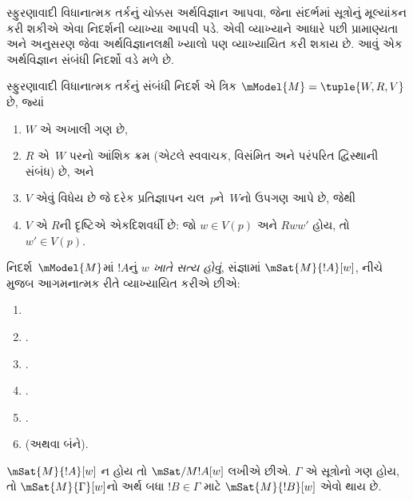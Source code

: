 \begingroup
\makeatletter{}\makeatother


\label{guunit:OLP-0500}


સ્ફુરણાવાદી વિધાનાત્મક તર્કનું ચોક્કસ અર્થવિજ્ઞાન આપવા,
જેના સંદર્ભમાં સૂત્રોનું મૂલ્યાંકન કરી શકીએ એવા
નિદર્શની વ્યાખ્યા આપવી પડે. એવી વ્યાખ્યાને આધારે પછી
પ્રામાણ્યતા અને અનુસરણ જેવા અર્થવિજ્ઞાનલક્ષી ખ્યાલો પણ
વ્યાખ્યાયિત કરી શકાય છે. આવું એક અર્થવિજ્ઞાન
સંબંધી નિદર્શો વડે મળે છે.

\begin{defn}
  સ્ફુરણાવાદી વિધાનાત્મક તર્કનું સંબંધી નિદર્શ
  એ ત્રિક $\mModel{M} = \tuple{W, R, V}$ છે, જ્યાં
  \begin{enumerate}
  \item $W$ એ અખાલી ગણ છે,
  \item $R$ એ~$W$ પરનો આંશિક ક્રમ (એટલે સ્વવાચક, વિસંમિત
    અને પરંપરિત દ્વિસ્થાની સંબંધ) છે, અને
  \item $V$ એવું વિધેય છે જે દરેક પ્રતિજ્ઞાપન ચલ~$p$ને~$W$નો ઉપગણ આપે છે, જેથી
  \item $V$ એ $R$ની દૃષ્ટિએ એકદિશવર્ધી છે: જો $w
    \in V(p)$ અને $Rww'$ હોય, તો $w' \in V(p)$.
  \end{enumerate}
\end{defn}

\begin{defn}
  નિદર્શ~$\mModel{M}$માં $!A$નું \emph{$w$ ખાતે સત્ય
    હોવું}, સંજ્ઞામાં $\mSat{M}{!A}[w]$, નીચે મુજબ
  આગમનાત્મક રીતે વ્યાખ્યાયિત કરીએ છીએ:
  \begin{enumerate}
  \item {}
  \item {}.
  \item {}.
  \item {}.
  \item {}.
  \item {} (અથવા બંને).
  \end{enumerate}
  $\mSat{M}{!A}[w]$ ન હોય તો $\mSat/{M}{!A}[w]$ લખીએ છીએ.
  $\Gamma$ એ સૂત્રોનો ગણ હોય, તો
  $\mSat{M}{\Gamma}[w]$નો અર્થ બધા $!B \in \Gamma$
  માટે $\mSat{M}{!B}[w]$ એવો થાય છે.
\end{defn}

